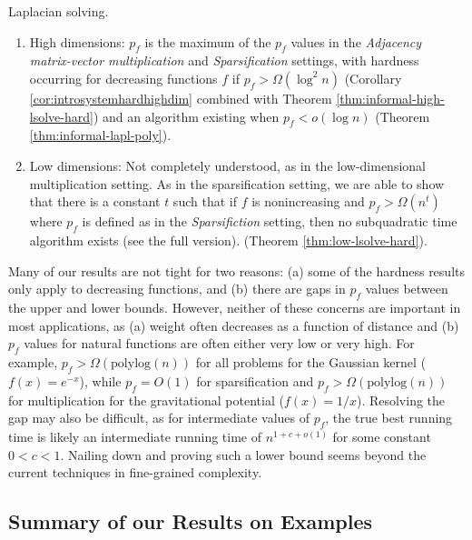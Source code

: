 \begin{compactenum}
\begin{enumerate}
    \end{enumerate}
    \item Laplacian solving.
    \begin{enumerate}
        \item High dimensions: $p_f$ is the maximum of the $p_f$ values in the \emph{Adjacency matrix-vector multiplication} and \emph{Sparsification} settings, with hardness occurring for decreasing functions $f$ if $p_f > \Omega(\log^2 n)$ (Corollary \ref{cor:introsystemhardhighdim} combined with Theorem \ref{thm:informal-high-lsolve-hard}) and an algorithm existing when $p_f < o(\log n)$ (Theorem \ref{thm:informal-lapl-poly}).
        \item Low dimensions: Not completely understood, as in the low-dimensional multiplication setting. As in the sparsification setting, we are able to show that there is a constant $t$ such that if $f$ is nonincreasing and $p_f > \Omega(n^t)$ where $p_f$ is defined as in the \emph{Sparsifiction} setting, then no subquadratic time algorithm exists \ifdefined\isfocs(see the full version).
        \else
        (Theorem \ref{thm:low-lsolve-hard}).
        \fi
    \end{enumerate}
\end{compactenum}

Many of our results are not tight for two reasons: (a) some of the hardness results only apply to decreasing functions, and (b) there are gaps in $p_f$ values between the upper and lower bounds. However, neither of these concerns are important in most applications, as (a) weight often decreases as a function of distance and (b) $p_f$ values for natural functions are often either very low or very high. For example, $p_f > \Omega(\text{polylog}(n))$ for all problems for the Gaussian kernel ($f(x) = e^{-x}$), while $p_f = O(1)$ for sparsification and $p_f > \Omega(\text{polylog}(n))$ for multiplication for the gravitational potential ($f(x) = 1/x$). Resolving the gap may also be difficult, as for intermediate values of $p_f$, the true best running time is likely an intermediate running time of $n^{1 + c + o(1)}$ for some constant $0<c<1$. Nailing down and proving such a lower bound seems beyond the current techniques in fine-grained complexity.

\subsection{Summary of our Results on Examples} \label{sec:resultstable}

